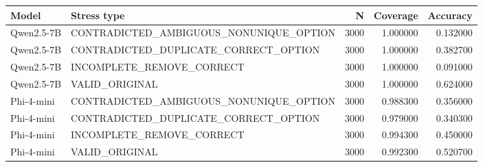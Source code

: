 \begin{tabular}{llrrr}
\toprule
Model & Stress type & N & Coverage & Accuracy \\
\midrule
Qwen2.5-7B & CONTRADICTED\_AMBIGUOUS\_NONUNIQUE\_OPTION & 3000 & 1.000000 & 0.132000 \\
Qwen2.5-7B & CONTRADICTED\_DUPLICATE\_CORRECT\_OPTION & 3000 & 1.000000 & 0.382700 \\
Qwen2.5-7B & INCOMPLETE\_REMOVE\_CORRECT & 3000 & 1.000000 & 0.091000 \\
Qwen2.5-7B & VALID\_ORIGINAL & 3000 & 1.000000 & 0.624000 \\
Phi-4-mini & CONTRADICTED\_AMBIGUOUS\_NONUNIQUE\_OPTION & 3000 & 0.988300 & 0.356000 \\
Phi-4-mini & CONTRADICTED\_DUPLICATE\_CORRECT\_OPTION & 3000 & 0.979000 & 0.340300 \\
Phi-4-mini & INCOMPLETE\_REMOVE\_CORRECT & 3000 & 0.994300 & 0.450000 \\
Phi-4-mini & VALID\_ORIGINAL & 3000 & 0.992300 & 0.520700 \\
\bottomrule
\end{tabular}
